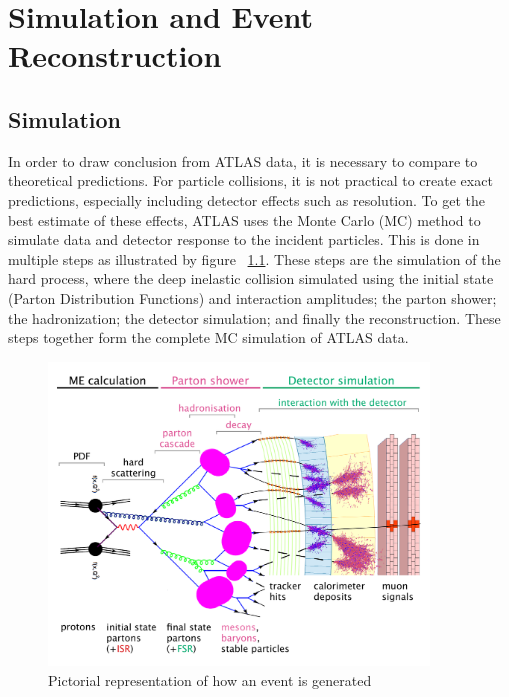 \chapter{Simulation and Event Reconstruction}
\label{chap:EvtReco} 
\section{Simulation}
In order to draw conclusion from ATLAS data, it is necessary to compare to theoretical predictions. For particle collisions, it is not practical to create exact predictions, especially including detector effects such as resolution. To get the best estimate of these effects, ATLAS uses the Monte Carlo (MC) method to simulate data and detector response to the incident particles. This is done in multiple steps as illustrated by figure ~\ref{fig:eventsim}. These steps are the simulation of the hard process, where the deep inelastic collision simulated using the initial state (Parton Distribution Functions) and interaction amplitudes; the parton shower; the hadronization; the detector simulation; and finally the reconstruction. These steps together form the complete MC simulation of ATLAS data.\newline

\begin{figure}[h]
\begin{center}
\includegraphics*[width=0.90\textwidth] {figures/event_simulation}
\caption[Event generation cartoon]{Pictorial representation of how an event is generated \cite{Wanotayaroj:2242196}}
\label{fig:eventsim}
\end{center}
\end{figure}

